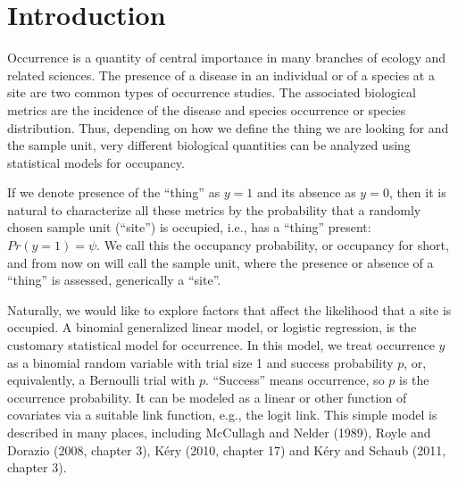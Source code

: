 \documentclass[12pt]{article}
\begin{document}
\singlespacing			%


\newpage
\raggedright
\setlength{\parindent}{.25in}



\section{Introduction}
Occurrence is a quantity of central importance in many branches of
ecology and related sciences.
The presence of a disease in an individual or of a species
at a site are two common types of occurrence studies.
The associated biological metrics are the incidence of the disease and
species occurrence or species distribution.
Thus, depending on how we define the thing we are looking for and the
sample unit, very different biological quantities can be analyzed
using statistical models for occupancy.

If we denote presence of the ``thing'' as $y=1$ and its absence as
$y=0$, then it is natural to characterize all these metrics by the
probability that a randomly chosen sample unit (``site'') is occupied,
i.e., has a ``thing'' present: $Pr(y=1) = \psi$.
We call this the occupancy probability, or occupancy for short, and
from now on will call the sample unit,
where the presence or absence of a ``thing'' is assessed, generically
a ``site''.

Naturally, we would like to explore factors that affect the likelihood
that a site is occupied.
A binomial generalized linear model, or logistic regression, is the
customary statistical model for occurrence.
In this model, we treat occurrence $y$ as a binomial random variable
with trial size 1 and success probability $p$, or, equivalently, a
Bernoulli trial with $p$.
``Success'' means occurrence, so $p$ is the occurrence probability.
It can be modeled as a linear or other function of covariates via a
suitable link function, e.g., the logit link.
This simple model is described in many places, including McCullagh and
Nelder (1989), Royle and Dorazio (2008, chapter 3), K\'{e}ry (2010,
chapter 17) and K\'{e}ry and Schaub (2011, chapter 3).
\end{document}
